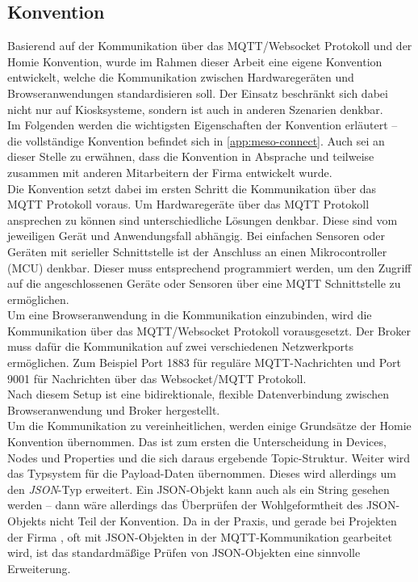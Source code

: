 \subsection{Konvention}
\label{subs:konvention}

Basierend auf der Kommunikation über das MQTT/Websocket Protokoll und der Homie Konvention,
wurde im Rahmen dieser Arbeit eine eigene Konvention entwickelt, welche die Kommunikation
zwischen Hardwaregeräten und Browseranwendungen standardisieren soll. Der Einsatz beschränkt
sich dabei nicht nur auf Kiosksysteme, sondern ist auch in anderen Szenarien denkbar.\\
Im Folgenden werden die wichtigsten Eigenschaften der Konvention erläutert -- die vollständige
Konvention befindet sich in \autoref{app:meso-connect}. Auch sei an dieser Stelle zu erwähnen,
dass die Konvention in Absprache und teilweise zusammen mit anderen Mitarbeitern 
der Firma \meso{} entwickelt wurde.\\

Die Konvention setzt dabei im ersten Schritt die Kommunikation über das MQTT Protokoll voraus.
Um Hardwaregeräte über das MQTT Protokoll ansprechen zu können sind unterschiedliche Lösungen 
denkbar. Diese sind vom jeweiligen Gerät und Anwendungsfall abhängig. Bei einfachen Sensoren oder
Geräten mit serieller Schnittstelle ist der Anschluss an einen Mikrocontroller (MCU) denkbar.
Dieser muss entsprechend programmiert werden, um den Zugriff auf die angeschlossenen Geräte 
oder Sensoren über eine MQTT Schnittstelle zu ermöglichen.\\
Um eine Browseranwendung in die Kommunikation einzubinden, wird die Kommunikation über das MQTT/Websocket
Protokoll vorausgesetzt. Der Broker muss dafür die Kommunikation auf zwei verschiedenen 
Netzwerkports ermöglichen. Zum Beispiel Port 1883 für reguläre MQTT-Nachrichten und Port 9001
für Nachrichten über das Websocket/MQTT Protokoll.\\
Nach diesem Setup ist eine bidirektionale, flexible Datenverbindung zwischen Browseranwendung
und Broker hergestellt.\\

Um die Kommunikation zu vereinheitlichen, werden einige Grundsätze der Homie Konvention übernommen.
Das ist zum ersten die Unterscheidung in Devices, Nodes und Properties und die sich daraus 
ergebende Topic-Struktur. Weiter wird das Typsystem für die Payload-Daten übernommen. 
Dieses wird allerdings um den \emph{JSON}-Typ erweitert. 
Ein JSON-Objekt kann auch als ein String gesehen werden -- dann wäre allerdings
das Überprüfen der Wohlgeformtheit des JSON-Objekts nicht Teil der Konvention.
Da in der Praxis, und gerade bei Projekten der Firma \meso{}, oft mit JSON-Objekten in der 
MQTT-Kommunikation gearbeitet wird, ist das standardmäßige Prüfen von JSON-Objekten eine
sinnvolle Erweiterung.

